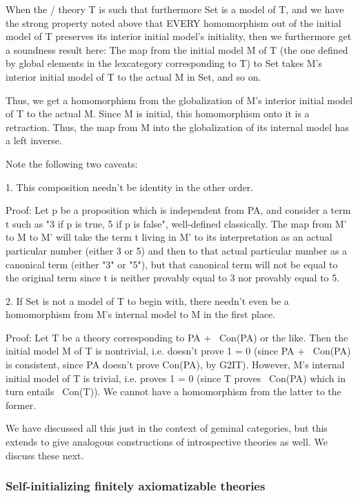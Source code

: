 \begin{TODOblock}
When the \initogeminal/ theory T is such that furthermore Set is a model of T, and we have the strong property noted above that EVERY homomorphism out of the initial model of T preserves its interior initial model's initiality, then we furthermore get a soundness result here: The map from the initial model M of T (the one defined by global elements in the lexcategory corresponding to T) to Set takes M's interior initial model of T to the actual M in Set, and so on.

Thus, we get a homomorphism from the globalization of M's interior initial model of T to the actual M. Since M is initial, this homomorphism onto it is a retraction. Thus, the map from M into the globalization of its internal model has a left inverse.

Note the following two caveats:

1. This composition needn't be identity in the other order.

Proof: Let p be a proposition which is independent from PA, and consider a term t such as "3 if p is true, 5 if p is false", well-defined classically. The map from M' to M to M' will take the term t living in M' to its interpretation as an actual particular number (either 3 or 5) and then to that actual particular number as a canonical term (either "3" or "5"), but that canonical term will not be equal to the original term since t is neither provably equal to 3 nor provably equal to 5.

2. If Set is not a model of T to begin with, there needn't even be a homomorphism from M's internal model to M in the first place.

Proof: Let T be a theory corresponding to PA + ~Con(PA) or the like. Then the initial model M of T is nontrivial, i.e. doesn't prove 1 = 0 (since PA + ~Con(PA) is consistent, since PA doesn't prove Con(PA), by G2IT). However, M's internal initial model of T is trivial, i.e. proves 1 = 0 (since T proves ~Con(PA) which in turn entails ~Con(T)). We cannot have a homomorphism from the latter to the former.
\end{TODOblock}

We have discussed all this just in the context of geminal categories, but this extends to give analogous constructions of introspective theories as well. We discuss these next.

\subsubsection{Self-initializing finitely axiomatizable theories}

